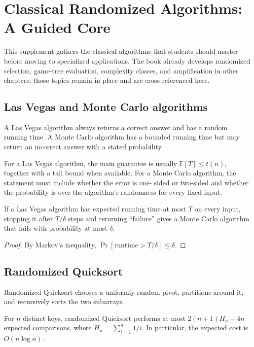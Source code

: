 \chapter{Classical Randomized Algorithms: A Guided Core}
\label{ch:stage3-classical-randomized}

This supplement gathers the classical algorithms that students should master
before moving to specialized applications.  The book already develops
randomized selection, game-tree evaluation, complexity classes, and
amplification in other chapters; those topics remain in place and are
cross-referenced here.

\section{Las Vegas and Monte Carlo algorithms}

\begin{definition}
A Las Vegas algorithm always returns a correct answer and has a random
running time.  A Monte Carlo algorithm has a bounded running time but may
return an incorrect answer with a stated probability.
\end{definition}

For a Las Vegas algorithm, the main guarantee is usually
$\mathbb{E}[T]\leq t(n)$, together with a tail bound when available.  For a
Monte Carlo algorithm, the statement must include whether the error is one-
sided or two-sided and whether the probability is over the algorithm's
randomness for every fixed input.

\begin{proposition}[Truncation]
If a Las Vegas algorithm has expected running time at most $T$ on every
input, stopping it after $T/\delta$ steps and returning ``failure'' gives a
Monte Carlo algorithm that fails with probability at most $\delta$.
\end{proposition}

\begin{proof}
By Markov's inequality, $\Pr[\text{runtime}>T/\delta]\leq\delta$.
\end{proof}

\section{Randomized Quicksort}

Randomized Quicksort chooses a uniformly random pivot, partitions around it,
and recursively sorts the two subarrays.

\begin{theorem}
For $n$ distinct keys, randomized Quicksort performs at most
$2(n+1)H_n-4n$ expected comparisons, where
$H_n=\sum_{i=1}^{n}1/i$.  In particular, the expected cost is
$O(n\log n)$.
\end{theorem}

